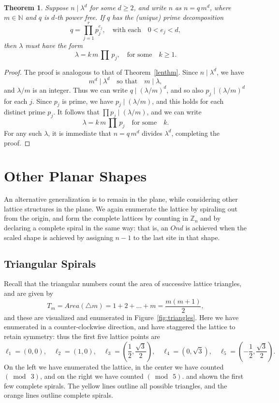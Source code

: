 \documentclass{article}
\newtheorem{theorem}{Theorem}
\theoremstyle{definition}
\def\ZZ{\mathbb{Z}}
\def\pmod#1{(\bmod\  #1)}
\def\com#1{\quad\text{{#1}}\quad}
\begin{document}
\begin{theorem}
\label{dimdthm}
Suppose $n\mid \lambda^d$ for some $d\ge 2$, and write $n$ as $n=q\,m^d$,
where $m \in \mathbb{N}$ and $q$ is $d$-th power free.  If $q$ has the
(unique) prime decomposition
\[
  q = \prod_{j=1}^{r} p_j^{e_j}, \com{with each}
  0<e_j<d,
\]
then $\lambda$ must have the form
\[
  \lambda = k \,m\, \textstyle{\prod}\, p_j, \com{for some}
  k \ge 1.
\]
\end{theorem}

\begin{proof}
The proof is analogous to that of Theorem~\ref{lenthm}.
Since $n\mid \lambda^d$, we have 
\[
  m^d\mid \lambda^d   \com{so that}
  m\mid \lambda ,
\]
and $\lambda/m$ is an integer.  Thus we can write $q\mid (\lambda/m)^d$,
and so also $p_j\mid (\lambda/m)^d$ for each $j$.  Since $p_j$ is prime,
we have $p_j\mid (\lambda/m)$, and this holds for each distinct prime
$p_j$.  It follows that $\prod p_j\mid (\lambda/m)$, and we can write
\[
  \lambda = k\, m\, \textstyle{\prod}\, p_j  \com{for some} k.
\]
For any such $\lambda$, it is immediate that $n=q\,m^d$ divides
$\lambda^d$, completing the proof.
\end{proof}

\section{Other Planar Shapes}

An alternative generalization is to remain in the plane, while
considering other lattice structures in the plane.  We again enumerate
the lattice by spiraling out from the origin, and form the complete
lattices by counting in $\ZZ_n$ and by declaring a complete spiral in
the same way: that is, an $Ond$ is achieved when the scaled shape is
achieved by assigning $n-1$ to the last site in that shape.

\subsection{Triangular Spirals}

Recall that the triangular numbers count the area of successive
lattice triangles, and are given by
\[
  T_m = Area(\triangle m) = 1+2+\dots+m = \frac{m(m+1)}2,
\]
and these are visualized and enumerated in
Figure~\ref{fig:triangles}.  Here we have enumerated in a
counter-clockwise direction, and have staggered the lattice to retain
symmetry: thus the first five lattice points are
\[\textstyle{
  \ell_1 = (0,0), \quad
  \ell_2 = (1,0), \quad
  \ell_3 = (\frac12,\frac{\sqrt3}2), \quad
  \ell_4 = (0,\sqrt3), \quad
  \ell_5 = (-\frac12,\frac{\sqrt3}2).}
\]
On the left we have enumerated the lattice, in the center we have
counted $\pmod 3$, and on the right we have counted $\pmod 5$.  and
shown the first few complete spirals.  The yellow lines outline all
possible triangles, and the orange lines outline complete spirals.
\end{document}
